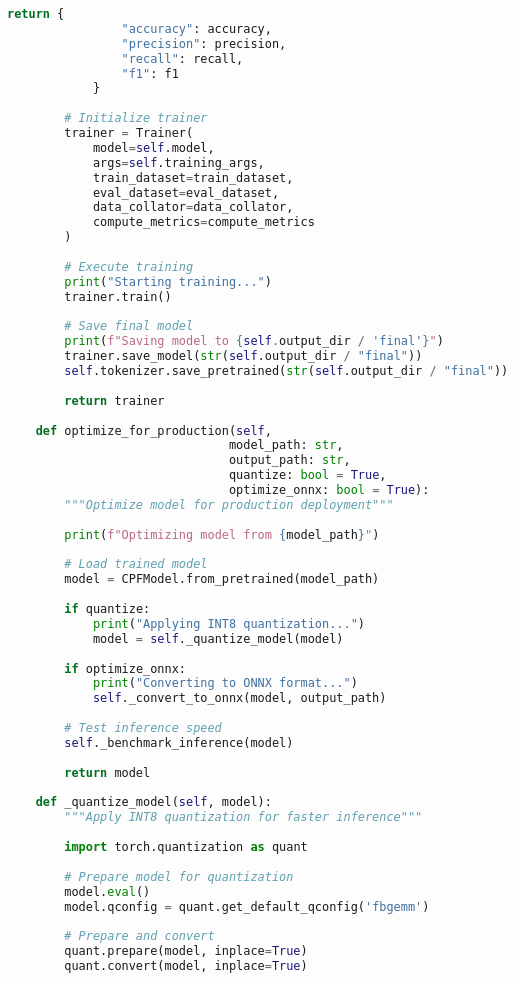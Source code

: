 \documentclass[11pt,a4paper]{article}
\begin{document}
\begin{lstlisting}[language=Python, caption=CPF Model Training Pipeline]
            return {
                "accuracy": accuracy,
                "precision": precision,
                "recall": recall,
                "f1": f1
            }
        
        # Initialize trainer
        trainer = Trainer(
            model=self.model,
            args=self.training_args,
            train_dataset=train_dataset,
            eval_dataset=eval_dataset,
            data_collator=data_collator,
            compute_metrics=compute_metrics
        )
        
        # Execute training
        print("Starting training...")
        trainer.train()
        
        # Save final model
        print(f"Saving model to {self.output_dir / 'final'}")
        trainer.save_model(str(self.output_dir / "final"))
        self.tokenizer.save_pretrained(str(self.output_dir / "final"))
        
        return trainer
    
    def optimize_for_production(self, 
                               model_path: str,
                               output_path: str,
                               quantize: bool = True,
                               optimize_onnx: bool = True):
        """Optimize model for production deployment"""
        
        print(f"Optimizing model from {model_path}")
        
        # Load trained model
        model = CPFModel.from_pretrained(model_path)
        
        if quantize:
            print("Applying INT8 quantization...")
            model = self._quantize_model(model)
        
        if optimize_onnx:
            print("Converting to ONNX format...")
            self._convert_to_onnx(model, output_path)
        
        # Test inference speed
        self._benchmark_inference(model)
        
        return model
    
    def _quantize_model(self, model):
        """Apply INT8 quantization for faster inference"""
        
        import torch.quantization as quant
        
        # Prepare model for quantization
        model.eval()
        model.qconfig = quant.get_default_qconfig('fbgemm')
        
        # Prepare and convert
        quant.prepare(model, inplace=True)
        quant.convert(model, inplace=True)
        

\end{lstlisting}
\end{document}
